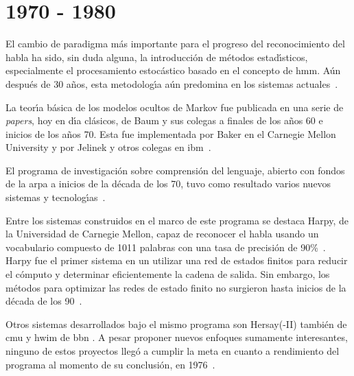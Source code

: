 \section{1970 - 1980}
\label{sec:70s}

El cambio de paradigma m\'as importante para el progreso del reconocimiento del habla ha sido, sin duda alguna,
la introducci\'on de m\'etodos estad{\'\i}sticos, especialmente el procesamiento estoc\'astico basado en el
concepto de \gls{hmm}. A\'un despu\'es de 30 a\~nos, esta metodolog{\'\i}a a\'un predomina en los
sistemas \mbox{actuales \cite{BakerResearch2009}}.

La teor{\'\i}a b\'asica de los modelos ocultos de Markov fue publicada en una serie de \emph{papers}, 
hoy en d{\'\i}a cl\'asicos, de Baum y sus colegas a finales de los a\~nos 60 e inicios de los a\~nos 70. 
Esta fue implementada por Baker en el Carnegie Mellon University y por Jelinek y otros colegas en 
\mbox{\gls{ibm} \cite{Rabiner89atutorial}}.

El programa de investigaci\'on sobre comprensi\'on del lenguaje, abierto con fondos de la \gls{arpa} 
a inicios de la d\'ecada de los 70, tuvo como resultado varios nuevos sistemas y 
\mbox{tecnolog{\'\i}as \cite{Furui50Years2004}}.

Entre los sistemas construidos en el marco de este programa se destaca Harpy, de la Universidad de Carnegie Mellon,
capaz de reconocer el habla usando un vocabulario compuesto de 1011 palabras con una tasa de 
precisi\'on de \mbox{90\% \cite{Newell1978}.} Harpy fue el primer sistema en un utilizar una red de estados finitos
para reducir el c\'omputo y determinar eficientemente la cadena de salida. 
Sin embargo, los m\'etodos para optimizar las redes de estado finito no surgieron hasta inicios de
la d\'ecada de los \mbox{90 \cite{JuangAutomaticSpeech}}.

Otros sistemas desarrollados bajo el mismo programa son Hersay(-II) tambi\'en de \gls{cmu} y \gls{hwim} 
de \gls{bbn} \cite{JuangAutomaticSpeech}. A pesar proponer nuevos enfoques sumamente interesantes, 
ninguno de estos proyectos lleg\'o a cumplir la meta en cuanto a rendimiento
del programa al momento de su conclusi\'on, en \mbox{1976 \cite{JuangAutomaticSpeech}}.